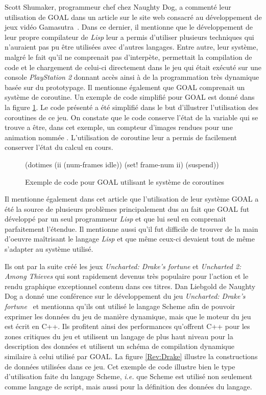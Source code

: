\documentclass[12pt,oneside,letterpaper,francais]{book}
\newcommand{\ie}{{\textit{i.e. }}}
\newcommand{\lisp}{{\textit{Lisp }}}
\newcommand{\scheme}[1]{\selectlanguage{english}{\tt #1}\selectlanguage{french}}
\begin{document}
Scott Shumaker, programmeur chef chez Naughty Dog, a commenté leur
utilisation de GOAL dans un article sur le site web consacré au
développement de jeux vidéo Gamasutra~\cite{ND_GOAL}. Dans ce dernier,
il mentionne que le développement de leur propre compilateur de \lisp
leur a permis d'utiliser plusieurs techniques qui n'auraient pas pu
être utilisées avec d'autres langages. Entre autre, leur système,
malgré le fait qu'il ne comprenait pas d'interpète, permettait la
compilation de code et le chargement de celui-ci directement dans le
jeu qui était exécuté sur une console \textit{PlayStation 2} donnant
accès ainsi à de la programmation très dynamique basée sur du
prototypage. Il mentionne également que GOAL comprenait un système de
coroutine. Un exemple de code simplifié pour GOAL est donné dans la
figure \ref{Rev:goal}. Le code présenté a été simplifié dans le but
d'illustrer l'utilisation des coroutines de ce jeu. On constate que le
code conserve l'état de la variable \scheme{ii} qui se trouve a être,
dans cet exemple, un compteur d'images rendues pour une animation
nommée \scheme{idle}. L'utilisation de coroutine leur a permis de
facilement conserver l'état du calcul en cours.

\begin{figure}[htb!]
  \begin{schemecode}
(dotimes (ii (num-frames idle))
  (set! frame-num ii)
  (suspend))
  \end{schemecode}
  \caption{Exemple de code pour GOAL utilisant le système de coroutines}
  \label{Rev:goal}
\end{figure}

Il mentionne également dans cet article que l'utilisation de leur
système GOAL a été la source de plusieurs problèmes principalement dus
au fait que GOAL fut développé par un seul programmeur \lisp et que lui
seul en comprenait parfaitement l'étendue. Il mentionne aussi qu'il
fut difficile de trouver de la main d'oeuvre maîtrisant le langage
\lisp et que même ceux-ci devaient tout de même s'adapter au système
utilisé.

Ils ont par la suite créé les jeux \textit{Uncharted: Drake's fortune}
et \textit{Uncharted 2: Among Thieves} qui sont rapidement devenus
très populaire pour l'action et le rendu graphique exceptionnel
contenu dans ces titres. Dan Liebgold de Naughty Dog a donné une
conférence sur le développement du jeu \textit{Uncharted: Drake's
  fortune}~\cite{ND_DRAKE} et mentionna qu'ils ont utilisé le langage
Scheme afin de pouvoir exprimer les données du jeu de manière
dynamique, mais que le moteur du jeu est écrit en C++. Ils profitent
ainsi des performances qu'offrent C++ pour les zones critiques du jeu
et utilisent un langage de plus haut niveau pour la description des
données et utilisent un schéma de compilation dynamique similaire à
celui utilisé par GOAL. La figure \ref{Rev:Drake} illustre la
constructions de données utilisées dans ce jeu. Cet exemple de code
illustre bien le type d'utilisation faite du langage Scheme, \ie que
Scheme est utilisé non seulement comme langage de script, mais aussi
pour la définition des données du langage.
\end{document}
